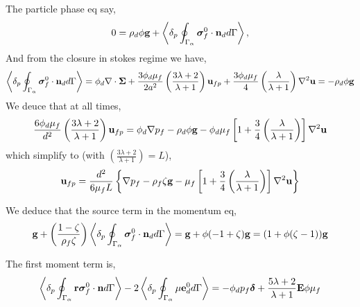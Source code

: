 \documentclass[12pt]{My_preprint}
\begin{document}
The particle phase eq say, 
\begin{equation*}
    0 
    = 
    \rho_d \phi \textbf{g}
    + \left<\delta_p \oint_{\Gamma_{\alpha}} {\bm{\sigma}_f^0 \cdot \textbf{n}_d} d\Gamma\right>,
\end{equation*}
And from the closure in stokes regime we have, 
\begin{equation*}
    \left<\delta_p \oint_{\Gamma_{\alpha}} \bm{\sigma}_f^0\cdot \textbf{n}_d d\Gamma\right> = 
    \phi_d \mathbf{\nabla}\cdot\bm\Sigma
    + \frac{3\phi_d\mu_f}{2 a^2} 
    \left(\frac{3\lambda+2}{\lambda+1}\right) \textbf{u}_{f p} 
    + \frac{3\phi_d\mu_f}{4} \left(\frac{\lambda}{\lambda+1}\right)\mathbf{\nabla}^2\textbf{u}
    = - 
    \rho_d \phi \textbf{g}
\end{equation*}
We deuce that at all times, 
\begin{align*}
    \frac{6\phi_d\mu_f}{d^2} 
    \left(\frac{3\lambda+2}{\lambda+1}\right) \textbf{u}_{f p} 
    = 
    \phi_d \mathbf{\nabla} p_f
    - \rho_d \phi \textbf{g}
    - \phi_d \mu_f \left[
        1 + \frac{3}{4} \left(\frac{\lambda}{\lambda+1}\right)
    \right]\mathbf{\nabla}^2 \textbf{u}
\end{align*}
which simplify to (with $\left(\frac{3\lambda+2}{\lambda+1}\right) = L$), 
\begin{align*}
   \textbf{u}_{f p} 
    = 
    \frac{d^2}{6\mu_f L }
    \left\{
        \mathbf{\nabla} p_f
        - \rho_f\zeta   \textbf{g}
        -  \mu_f \left[
            1 + \frac{3}{4} \left(\frac{\lambda}{\lambda+1}\right)
            \right]\mathbf{\nabla}^2 \textbf{u}
    \right\}
\end{align*}


We deduce that the source term in the momentum eq, 
\begin{equation*}
    \textbf{g} 
    + \left(\frac{1-\zeta}{\rho_f\zeta}\right)
    \left<\delta_p \oint_{\Gamma_{\alpha}} {\bm{\sigma}_f^0 \cdot \textbf{n}_d} d\Gamma\right>
    =
    \textbf{g}
    +  
    \phi (- 1 + \zeta)
    \textbf{g}
    = (1 + \phi(\zeta-1) )\textbf{g}
\end{equation*}


The first moment term is, 
\begin{equation*}
    \left<\delta_p \oint_{\Gamma_{\alpha}} \textbf{r}\bm{\sigma}_f^0 \cdot \textbf{n} d\Gamma\right> -
    2\left<\delta_p \oint_{\Gamma_{\alpha}} \mu\textbf{e}_d^0 d\Gamma\right> 
    = 
    - \phi_d p_f\bm\delta
    + \frac{5\lambda +2}{\lambda +1}
    \textbf{E} \phi \mu_f
\end{equation*}


\appendix
\end{document}
